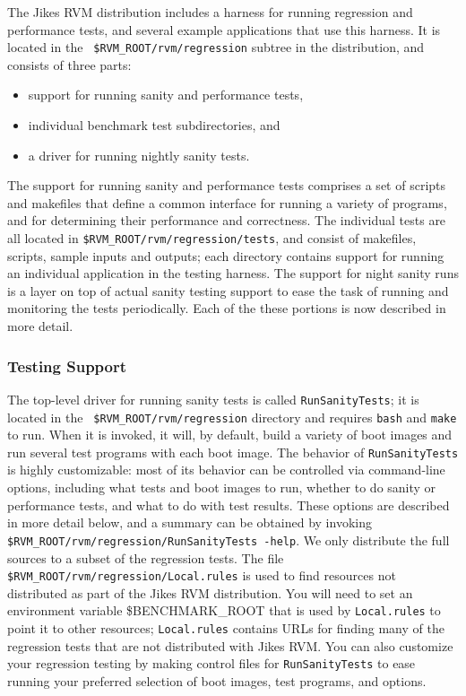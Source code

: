  The Jikes\TMweb{} RVM distribution includes a harness for running
regression and performance tests, and several example applications
that use this harness.  It is located in the {\tt
\$RVM\_\-ROOT/rvm/regression} subtree in the distribution, and consists
of three parts:
\begin{itemize}
\item support for running sanity and performance tests, 
\item individual benchmark test subdirectories, and 
\item a driver for running nightly sanity tests.  
\end{itemize}
The support for running
sanity and performance tests comprises a set of scripts and makefiles
that define a common interface for running a variety of programs, and
for determining their performance and correctness.  The individual
tests are all located in {\tt{\$RVM\_\-ROOT/rvm/regression/tests}}, and
consist of makefiles, scripts, sample inputs and outputs; each
directory contains support for running an individual application in
the testing harness.  The support for night sanity runs is a layer on
top of actual sanity testing support to ease the task of running and
monitoring the tests periodically.  Each of the these portions is now
described in more detail.

\subsubsection{Testing Support}

The top-level driver for running sanity tests is called
{\tt{RunSanityTests}}; it is located in the {\tt
\$RVM\_\-ROOT/rvm/regression} directory 
and requires {\tt{bash}} and {{\tt make}} to run.  When it
is invoked, it will, by default, build a variety of boot images and
run several test programs with each boot image.  The behavior of
\texttt{RunSanityTests} is highly customizable: most of its behavior can be
controlled via command-line options, including what tests and boot
images to run, whether to do sanity or performance tests, and what to
do with test results. These options are described in more detail
below, and a summary can be obtained by invoking {\tt
\$RVM\_\-ROOT/rvm/regression/RunSanityTests -help}. 
We only distribute the full sources to a subset of the regression
tests. The file {\tt \$RVM\_\-ROOT/rvm/regression/Local.rules} is used
to find resources not distributed as part of the Jikes RVM
distribution.  You will need to set an environment variable 
\$BENCHMARK\_\-ROOT that is used by {\tt Local.rules} to point it to
other resources; {\tt Local.rules} contains URLs for finding many of
the regression tests that are not distributed with Jikes RVM.
You can also customize your regression testing by making control files
for \texttt{RunSanityTests} to ease running your preferred selection of boot
images, test programs, and options. 

